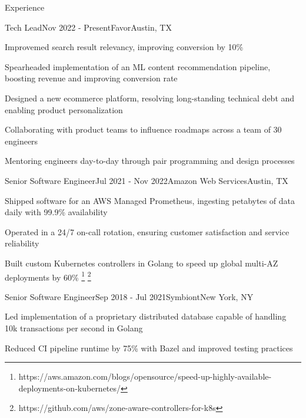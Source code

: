 \documentclass[
	10pt, %
]{resume} %
\begin{document}

\begin{rSection}{Experience}

	\begin{rSubsection}{Tech Lead}{Nov 2022 - Present}{Favor}{Austin, TX}
        \item Improvemed search result relevancy, improving conversion by 10\%
        \item Spearheaded implementation of an ML content recommendation pipeline, boosting revenue and improving conversion rate
        \item Designed a new ecommerce platform, resolving long-standing technical debt and enabling product personalization
        \item Collaborating with product teams to influence roadmaps across a team of 30 engineers
        \item Mentoring engineers day-to-day through pair programming and design processes
	\end{rSubsection}


    \begin{rSubsection}{Senior Software Engineer}{Jul 2021 - Nov 2022}{Amazon Web Services}{Austin, TX}
        \item Shipped software for an AWS Managed Prometheus, ingesting petabytes of data daily with 99.9\% availability
        \item Operated in a 24/7 on-call rotation, ensuring customer satisfaction and service reliability
        \item Built custom Kubernetes controllers in Golang to speed up global multi-AZ deployments by 60\% \footnote{https://aws.amazon.com/blogs/opensource/speed-up-highly-available-deployments-on-kubernetes/} \footnote{https://github.com/aws/zone-aware-controllers-for-k8s}
    \end{rSubsection}
    

    \begin{rSubsection}{Senior Software Engineer}{Sep 2018 - Jul 2021}{Symbiont}{New York, NY}
        \item Led implementation of a proprietary distributed database capable of handling 10k transactions per second in Golang
        \item Reduced CI pipeline runtime by 75\% with Bazel and improved testing practices
    \end{rSubsection}


\end{rSection}
\end{document}
